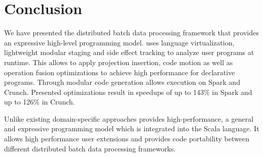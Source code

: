 \section{Conclusion}
\label{sec:conclusion}

We have presented the distributed batch data processing framework \tool that provides an
expressive high-level programming model. \tool uses language virtualization,
lightweight modular staging and side effect tracking to analyze user programs at
runtime. This allows \tool to apply projection insertion, code motion as well as
operation fusion optimizations to achieve high performance for declarative
programs. Through modular code generation \tool allows execution on Spark and
Crunch. Presented optimizations result in speedups of up to 143\% in
Spark and up to 126\% in Crunch.

Unlike existing domain-specific approaches \tool provides high-performance,
a general and expressive programming model which is integrated into the Scala
language. It allows high performance user extensions and provides code
portability between different distributed batch data processing frameworks.
